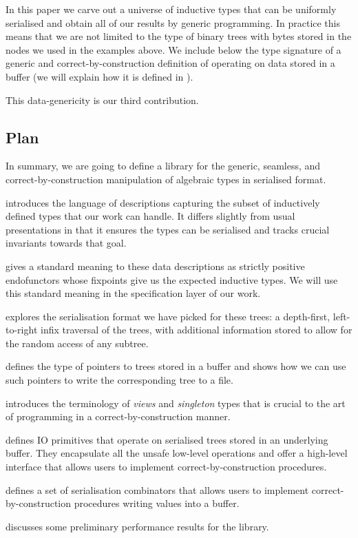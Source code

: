 In this paper we carve out a universe of inductive types that can be
uniformly serialised and obtain all of our results by generic programming.
%
In practice this means that we are not limited to the type of binary trees
with bytes stored in the nodes we used in the examples above.
%
We include below the type signature of a generic and correct-by-construction
definition of  operating on data stored in a buffer
(we will explain how it is defined in ).


This data-genericity is our third contribution.

\subsection{Plan}

In summary, we are going to define a library for the
generic,
seamless,
and correct-by-construction
manipulation of algebraic types in serialised format.


 introduces the language of descriptions capturing the
subset of inductively defined types that our work can handle.
It differs slightly from usual presentations in that it ensures the
types can be serialised and tracks crucial invariants towards that goal.

 gives a standard meaning to these data descriptions
as strictly positive endofunctors whose fixpoints give us the expected
inductive types.
%
We will use this standard meaning in the specification layer of our work.

 explores the serialisation format we have picked
for these trees: a depth-first, left-to-right infix traversal of the
trees, with additional information stored to allow for the random access
of any subtree.

 defines the type of pointers to trees stored in a
buffer and shows how we can use such pointers to write the corresponding
tree to a file.

 introduces the terminology of \emph{views} and
\emph{singleton} types that is crucial to the art of programming
in a correct-by-construction manner.

 defines IO primitives that operate on serialised
trees stored in an underlying buffer.
%
They encapsulate all the unsafe low-level operations and offer a
high-level interface that allows users to implement correct-by-construction
procedures.

 defines a set of serialisation combinators that
allows users to implement correct-by-construction procedures writing
values into a buffer.

 discusses some preliminary performance results for
the library.

